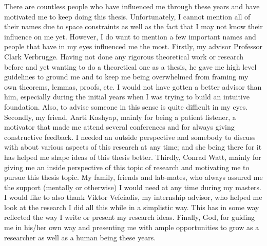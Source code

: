 There are countless people who have influenced me through these years and have motivated me to keep doing this thesis.
Unfortunately, I cannot mention all of their names due to space constraints as well as the fact that I may not know their influence on me yet.
However, I do want to mention a few important names and people that have in my eyes influenced me the most. 
Firstly, my advisor Professor Clark Verbrugge.
Having not done any rigorous theoretical work or research before and yet wanting to do a theoretical one as a thesis, he gave me high level guidelines to ground me and to keep me being overwhelmed from framing my own theorems, lemmas, proofs, etc. 
I would not have gotten a better advisor than him, especially during the initial years when I was trying to build an intuitive foundation. 
Also, to advise someone in this sense is quite difficult in my eyes.
Secondly, my friend, Aarti Kashyap, mainly for being a patient listener, a motivator that made me attend several conferences and for always giving constructive feedback. 
I needed an outside perspective and somebody to discuss with about various aspects of this research at any time; and she being there for it has helped me shape ideas of this thesis better. 
Thirdly, Conrad Watt, mainly for giving me an inside perspective of this topic of research and motivating me to pursue this thesis topic.
My family, friends and lab-mates, who always assured me the support (mentally or otherwise) I would need at any time during my masters. 
I would like to also thank Viktor Vefeiadis, my internship advisor, who helped me look at the research I did all this while in a simplistic way.
This has in some way reflected the way I write or present my research ideas.
Finally, God, for guiding me in his/her own way and presenting me with ample opportunities to grow as a researcher as well as a human being these years.